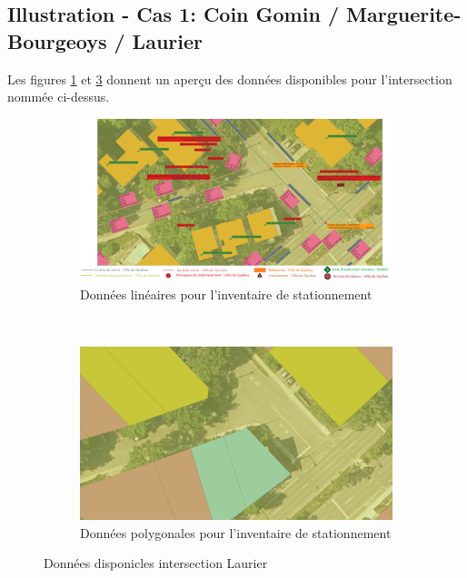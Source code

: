 \subsection{Illustration - Cas 1: Coin Gomin / Marguerite-Bourgeoys / Laurier}
Les figures \ref{fig:donnes_panneaux_Laurier} et \ref{fig:donnes_polygone_panneaux_Laurier} donnent un aperçu des données disponibles pour l'intersection nommée ci-dessus.
\begin{figure}[ht]
  \centering
  \begin{subfigure}{\linewidth}
    \includegraphics[width=1.0\textwidth]{images/donnees_disponible_Laurier_legende.png}
  \caption{Données linéaires pour l'inventaire de stationnement}
  \label{fig:donnes_panneaux_Laurier}
  \end{subfigure} \\
  \begin{subfigure}{\linewidth}
    \includegraphics[width=1.0\textwidth]{images/utilisation_sols_Laurier.png}
  \caption{Données polygonales pour l'inventaire de stationnement}
  \label{fig:donnes_polygone_panneaux_Laurier}
  \end{subfigure}
  \caption{Données disponicles intersection Laurier}
\end{figure}

